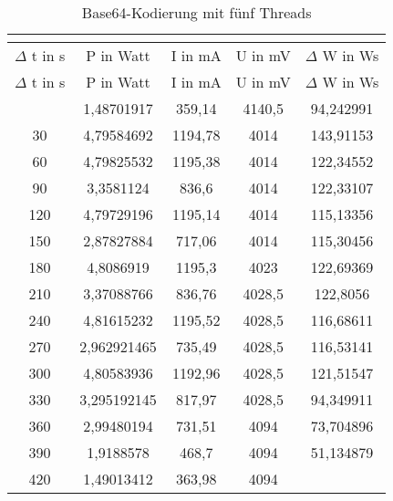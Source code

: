 
\begin{longtable}[c]{ccccc}
\caption{Base64-Kodierung mit f{\"u}nf Threads} \\
\label{tab:Base64MessungThreadFuenf}\\
\hline
{$\Delta$ t in s} & {P in Watt} & {I in mA} & {U in mV} & {$\Delta$ W in Ws} \\
\hline
\endfirsthead
\hline
$\Delta$ t in s & P in Watt & I in mA & U in mV & $\Delta$ W in Ws \\
\hline
\endhead
\hline
\endfoot
\hline
        \midrule
    0     & 1,48701917 & 359,14 & 4140,5 & 94,242991 \\
    \midrule
    30    & 4,79584692 & 1194,78 & 4014  & 143,91153 \\
    \midrule
    60    & 4,79825532 & 1195,38 & 4014  & 122,34552 \\
    \midrule
    90    & 3,3581124 & 836,6 & 4014  & 122,33107 \\
    \midrule
    120   & 4,79729196 & 1195,14 & 4014  & 115,13356 \\
    \midrule
    150   & 2,87827884 & 717,06 & 4014  & 115,30456 \\
    \midrule
    180   & 4,8086919 & 1195,3 & 4023  & 122,69369 \\
    \midrule
    210   & 3,37088766 & 836,76 & 4028,5 & 122,8056 \\
    \midrule
    240   & 4,81615232 & 1195,52 & 4028,5 & 116,68611 \\
    \midrule
    270   & 2,962921465 & 735,49 & 4028,5 & 116,53141 \\
    \midrule
    300   & 4,80583936 & 1192,96 & 4028,5 & 121,51547 \\
    \midrule
    330   & 3,295192145 & 817,97 & 4028,5 & 94,349911 \\
    \midrule
    360   & 2,99480194 & 731,51 & 4094  & 73,704896 \\
    \midrule
    390   & 1,9188578 & 468,7 & 4094  & 51,134879 \\
    \midrule
    420   & 1,49013412 & 363,98 & 4094  &  \\
\end{longtable}
